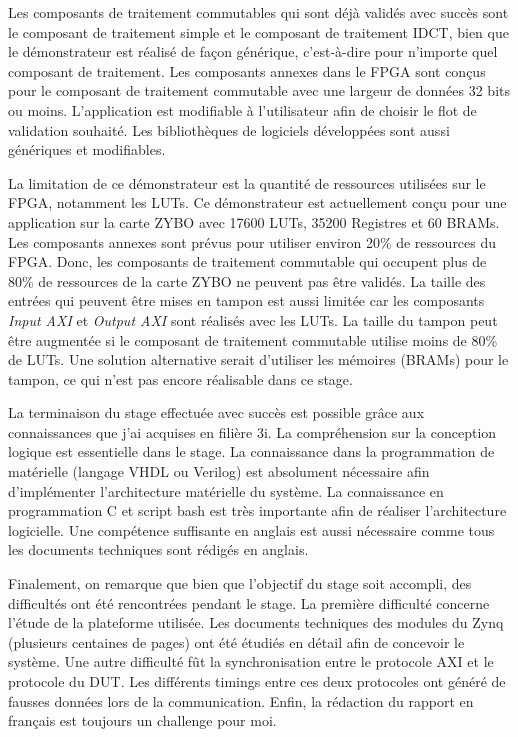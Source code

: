 Les composants de traitement commutables qui sont déjà validés avec succès sont le composant de traitement simple et
le composant de traitement IDCT, bien que le démonstrateur est réalisé de façon générique, c'est-à-dire pour n'importe
quel composant de traitement. Les composants annexes dans le FPGA sont conçus pour le composant de traitement
commutable avec une largeur de données 32 bits ou moins. L'application est modifiable à l'utilisateur afin de choisir
le flot de validation souhaité. Les bibliothèques de logiciels développées sont aussi génériques et modifiables.

La limitation de ce démonstrateur est la quantité de ressources utilisées sur le FPGA, notamment les LUTs. 
Ce démonstrateur est actuellement conçu pour une
application sur la carte ZYBO avec 17600 LUTs, 35200 Registres et 60 BRAMs. 
Les composants annexes sont prévus pour utiliser environ 20\% de ressources du FPGA.
Donc, les composants de traitement commutable qui occupent plus de 80\% de ressources de la carte ZYBO
ne peuvent pas être validés. La taille des entrées qui peuvent être mises en tampon est aussi limitée car les composants
\emph{Input AXI} et \emph{Output AXI} sont réalisés avec les LUTs. 
La taille du tampon peut être augmentée si le composant de traitement commutable utilise moins de 80\% de LUTs.
Une solution alternative serait d'utiliser les mémoires (BRAMs) pour le tampon, ce qui n'est pas encore réalisable
dans ce stage.

La terminaison du stage effectuée avec succès est possible grâce aux connaissances que j'ai acquises en filière 3i.
La compréhension sur la conception logique est essentielle dans le stage.
La connaissance dans la programmation de matérielle (langage VHDL ou Verilog) est absolument nécessaire afin d'implémenter l'architecture
matérielle du système. La connaissance en programmation C et script bash est très importante afin de réaliser
l'architecture logicielle. Une compétence suffisante en anglais est aussi nécessaire comme tous les documents
techniques sont rédigés en anglais.

Finalement, on remarque que bien que l'objectif du stage soit accompli, des difficultés ont été rencontrées pendant
le stage. La première difficulté concerne l'étude de la plateforme utilisée.
Les documents techniques des modules du Zynq (plusieurs centaines de pages) ont été étudiés en détail afin 
de concevoir le système. Une autre difficulté fût la synchronisation entre le protocole AXI et le protocole du DUT.
Les différents timings entre ces deux protocoles ont généré de fausses données lors de la communication. 
Enfin, la rédaction du rapport en français est toujours un challenge pour moi.











